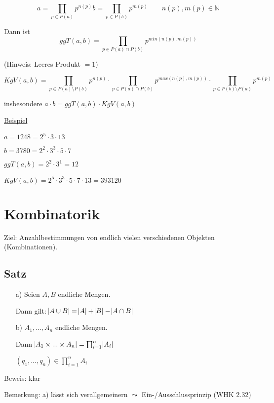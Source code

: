 \documentclass[a4paper, 12pt, twoside] {article}
\begin{document}
$$ a = \prod_{p \in P(a)} p^{n(p)} b = \prod_{p \in P(b)} p^{m(p)}	\qquad n(p), m(p) \in \mathbb{N}$$

Dann ist $$ggT(a,b) = \prod_{p \in P(a) \cap P(b)} p^{min(n(p),m(p))}$$

\hfill (Hinweis: Leeres Produkt $= 1$)
	
$$KgV(a,b) = \prod_{p \in P(a) \setminus P(b)} p^{n(p)} \cdot \prod_{p \in P(a) \cap P(b)} p^{max(n(p),m(p))} \cdot \prod_{p \in P(b) \setminus P(a)} p^{m(p)}$$

insbesondere $a \cdot b = ggT(a,b) \cdot KgV(a,b)$

\underline{Beispiel}

$a = 1248 = 2^5 \cdot 3 \cdot 13$

$b = 3780 = 2^2 \cdot 3^3 \cdot 5 \cdot 7$

$ggT(a,b) = 2^2 \cdot 3^1 = 12$

$KgV(a,b) = 2^5 \cdot 3^3 \cdot 5 \cdot 7 \cdot 13 = 393 120$

\section{Kombinatorik} %

Ziel: Anzahlbestimmungen von endlich vielen verschiedenen Objekten (Kombinationen).

\subsection{Satz} %

\begin{itemize}
\item[a)] Seien $A,B$ endliche Mengen.

Dann gilt: $\abs{A \cup B} = \abs{A} + \abs{B} - \abs{A \cap B}$

\item[b)] $A_1, ..., A_n$ endliche Mengen.

Dann $\abs{A_1 \times ... \times A_n} = \prod_{i=1}^n \abs{A_i}$

$(q_1, ..., q_n) \in \prod_{i=1}^n A_i$

\end{itemize}

Beweis: klar


Bemerkung: a) lässt sich verallgemeinern $\leadsto$ Ein-/Ausschlussprinzip (WHK 2.32)
\end{document}
